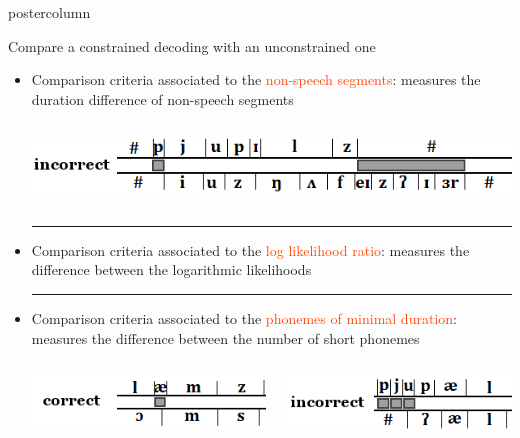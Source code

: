 \documentclass[final,hyperref={pdfpagelabels=false}]{beamer}
\begin{document}
\begin{frame}
\begin{columns}
\begin{column}{.40\textwidth}
\begin{beamercolorbox}[center,wd=\textwidth]{postercolumn}
\begin{minipage}[T]{.95\textwidth}
{\begin{block}{Compare a constrained decoding with an unconstrained one}
\begin{itemize}
\begin{columns}
			\end{columns}
			\textcolor{ta3skyblue}{\rule[0.1ex]{0.97\textwidth}{1.6pt}}
%
		\item Comparison criteria associated to the \textcolor{OrangeRed}{non-speech segments}: measures the duration difference of non-speech segments
			\begin{columns}
				\begin{column}{0.50\textwidth} \begin{center}\includegraphics[scale=1]{Image/criteria/sil.png}\end{center}\end{column}
			\end{columns}
			\textcolor{ta3skyblue}{\rule[0.1ex]{0.97\textwidth}{1.6pt}}
%
		\item Comparison criteria associated to the \textcolor{OrangeRed}{log likelihood ratio}: measures the difference between the logarithmic likelihoods
			\textcolor{ta3skyblue}{\rule[0.1ex]{0.97\textwidth}{1.6pt}}
%
		\item Comparison criteria associated to the \textcolor{OrangeRed}{phonemes of minimal duration}: measures the difference between the number of short phonemes
			\begin{columns}
				\begin{column}{0.50\textwidth} \hfill\includegraphics[scale=1]{Image/criteria/dur_correct.png}\end{column}
				\begin{column}{0.50\textwidth} \begin{center} \includegraphics[scale=1]{Image/criteria/dur_incorrect.png}\end{center}\end{column}
			\end{columns}
	\end{itemize}
    \end{block}
  }
\end{minipage}
\end{beamercolorbox}
\end{column}



\end{columns}
\end{frame}
\end{document}
